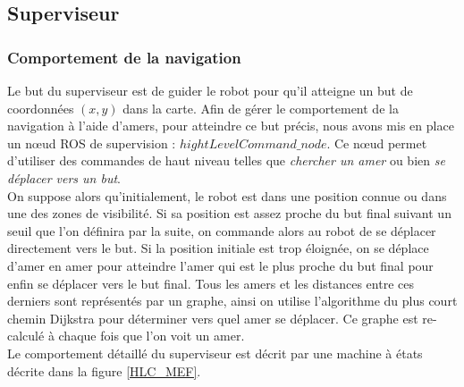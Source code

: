 \documentclass[10pt,a4paper]{article}
\begin{document}
\newpage
\subsection{Superviseur}
\label{sec:superviseur}

\subsubsection{Comportement de la navigation}

Le but du superviseur est de guider le robot pour qu'il atteigne un but de coordonnées $(x,y)$ dans la carte. Afin de gérer le comportement de la navigation à l'aide d'amers, pour atteindre ce but précis, nous avons mis en place un nœud ROS de supervision : $hightLevelCommand\_node$. Ce nœud permet d'utiliser des commandes de haut niveau telles que \textit{chercher un amer} ou bien \textit{se déplacer vers un but}.\\

On suppose alors qu'initialement, le robot est dans une position connue ou dans une des zones de visibilité. Si sa position est assez proche du but final suivant un seuil que l'on définira par la suite, on commande alors au robot de se déplacer directement vers le but. Si la position initiale est trop éloignée, on se déplace d'amer en amer pour atteindre l'amer qui est le plus proche du but final pour enfin se déplacer vers le but final. Tous les amers et les distances entre ces derniers sont représentés par un graphe, ainsi on utilise l'algorithme du plus court chemin Dijkstra pour déterminer vers quel amer se déplacer. Ce graphe est re-calculé à chaque fois que l'on voit un amer.\\

Le comportement détaillé du superviseur est décrit par une machine à états décrite dans la figure \ref{HLC_MEF}.
\end{document}
